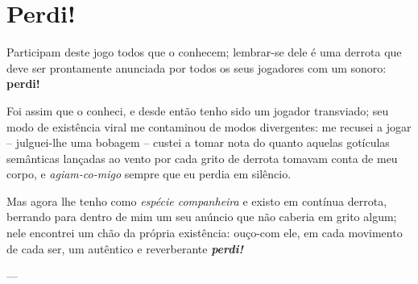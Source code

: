 \section{Perdi!}


Participam deste jogo todos que o conhecem;
    lembrar-se dele é uma derrota que deve ser prontamente anunciada por todos os seus jogadores com um sonoro:
        \textbf{perdi!}

Foi assim que o conheci, e desde então tenho sido um jogador transviado;
    seu modo de existência viral me contaminou de modos divergentes:
        me recusei a jogar -- julguei-lhe uma bobagem -- custei a tomar nota do quanto aquelas gotículas semânticas lançadas ao vento por cada grito de derrota tomavam conta de meu corpo, e \textit{agiam-co-migo} sempre que eu perdia em silêncio.

Mas agora lhe tenho como \textit{espécie companheira} e existo em contínua derrota, berrando para dentro de mim um seu anúncio que não caberia em grito algum;
    nele encontrei um chão da própria existência:
        ouço-com ele, em cada movimento de cada ser, um autêntico e reverberante \textbf{\textit{perdi!}}

---

